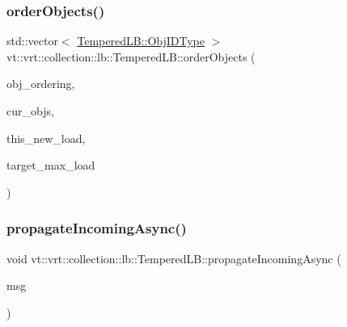 \subsubsection{\texorpdfstring{order\+Objects()}{orderObjects()}}
{\footnotesize\ttfamily std\+::vector$<$ \hyperlink{structvt_1_1vrt_1_1collection_1_1lb_1_1_base_l_b_a790b22acf448880599724749cdc4e9b3}{Tempered\+L\+B\+::\+Obj\+I\+D\+Type} $>$ vt\+::vrt\+::collection\+::lb\+::\+Tempered\+L\+B\+::order\+Objects (\begin{DoxyParamCaption}\item[{\hyperlink{namespacevt_1_1vrt_1_1collection_1_1lb_a3c71e131f84e2ccbb95f43a1058c749c}{Object\+Order\+Enum}}]{obj\+\_\+ordering,  }\item[{std\+::unordered\+\_\+map$<$ \hyperlink{structvt_1_1vrt_1_1collection_1_1lb_1_1_base_l_b_a790b22acf448880599724749cdc4e9b3}{Obj\+I\+D\+Type}, \hyperlink{namespacevt_a8fb51741340b87d7aaee0bef60e9896b}{Load\+Type} $>$}]{cur\+\_\+objs,  }\item[{\hyperlink{namespacevt_a8fb51741340b87d7aaee0bef60e9896b}{Load\+Type}}]{this\+\_\+new\+\_\+load,  }\item[{\hyperlink{namespacevt_a8fb51741340b87d7aaee0bef60e9896b}{Load\+Type}}]{target\+\_\+max\+\_\+load }\end{DoxyParamCaption})\hspace{0.3cm}{\ttfamily [static]}}

\mbox{\label{structvt_1_1vrt_1_1collection_1_1lb_1_1_tempered_l_b_a15dd6de3c9fe1998dae4bc685c991bb5}} 
\subsubsection{\texorpdfstring{propagate\+Incoming\+Async()}{propagateIncomingAsync()}}
{\footnotesize\ttfamily void vt\+::vrt\+::collection\+::lb\+::\+Tempered\+L\+B\+::propagate\+Incoming\+Async (\begin{DoxyParamCaption}\item[{\hyperlink{structvt_1_1vrt_1_1collection_1_1lb_1_1_tempered_l_b_a38d9ad7e92612cdbdf564b6f49b516a7}{Load\+Msg\+Async} $\ast$}]{msg }\end{DoxyParamCaption})\hspace{0.3cm}{\ttfamily [protected]}}

